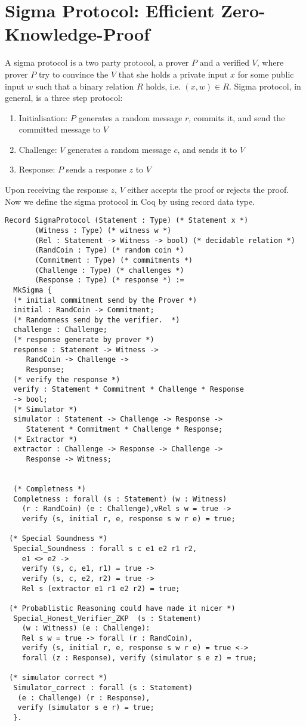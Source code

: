  



\section{Sigma Protocol: Efficient Zero-Knowledge-Proof}
\label{sec:sigma_coq}
A sigma protocol is a two party protocol, a prover $P$ and a verified $V$, where prover $P$ try to convince the $V$ that she 
holds a private input $x$ for some public input $w$ such that a binary relation $R$ holds, i.e. $(x, w) \in R$.  Sigma protocol, 
in general, is a three step protocol:
\begin{enumerate}
\item Initialisation: $P$ generates a random message $r$, commits it, and send the committed message to $V$
\item Challenge: $V$ generates a random message $c$, and sends it to $V$
\item Response: $P$ sends a response $z$ to $V$
\end{enumerate} 

\noindent
Upon receiving the response $z$, $V$ either accepts the proof or rejects the proof.  Now we define the sigma protocol in 
Coq by using record data type.

\begin{verbatim}
Record SigmaProtocol (Statement : Type) (* Statement x *)
       (Witness : Type) (* witness w *)
       (Rel : Statement -> Witness -> bool) (* decidable relation *)
       (RandCoin : Type) (* random coin *) 
       (Commitment : Type) (* commitments *)
       (Challenge : Type) (* challenges *) 
       (Response : Type) (* response *) :=
  MkSigma {
  (* initial commitment send by the Prover *)
  initial : RandCoin -> Commitment;
  (* Randomness send by the verifier.  *) 
  challenge : Challenge;
  (* response generate by prover *)
  response : Statement -> Witness ->
     RandCoin -> Challenge ->
     Response;
  (* verify the response *)
  verify : Statement * Commitment * Challenge * Response
  -> bool;
  (* Simulator *)
  simulator : Statement -> Challenge -> Response ->
     Statement * Commitment * Challenge * Response;
  (* Extractor *)
  extractor : Challenge -> Response -> Challenge -> 
     Response -> Witness;
  

  (* Completness *)
  Completness : forall (s : Statement) (w : Witness)
    (r : RandCoin) (e : Challenge),vRel s w = true -> 
    verify (s, initial r, e, response s w r e) = true;

 (* Special Soundness *)
  Special_Soundness : forall s c e1 e2 r1 r2,
    e1 <> e2 ->
    verify (s, c, e1, r1) = true ->
    verify (s, c, e2, r2) = true ->
    Rel s (extractor e1 r1 e2 r2) = true;
  
 (* Probablistic Reasoning could have made it nicer *)
  Special_Honest_Verifier_ZKP  (s : Statement) 
    (w : Witness) (e : Challenge): 
    Rel s w = true -> forall (r : RandCoin), 
    verify (s, initial r, e, response s w r e) = true <->
    forall (z : Response), verify (simulator s e z) = true;
  
 (* simulator correct *)
  Simulator_correct : forall (s : Statement) 
   (e : Challenge) (r : Response),
   verify (simulator s e r) = true;
  }.
\end{verbatim}


